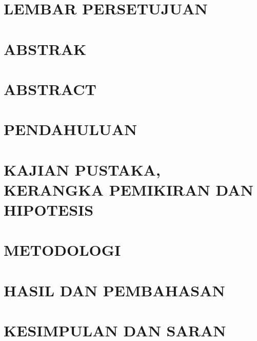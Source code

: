 \documentclass[12pt, a4paper, onecolumn, oneside, final]{report}
\begin{document}
\singlespacing



\setcounter{page}{1}
\singlespacing

\chapter*{LEMBAR PERSETUJUAN}


\chapter*{ABSTRAK}


\chapter*{ABSTRACT}


\singlespacing
\tableofcontents
\listoffigures
\listoftables
\clearpage

\doublespacing
\renewcommand{\thechapter}{\Roman{chapter}}
\renewcommand{\thesection}{\arabic{chapter}.\arabic{section}}
\renewcommand{\thefigure}{\arabic{chapter}.\arabic{figure}}
\renewcommand{\thetable}{\arabic{chapter}.\arabic{table}}
\chapter{PENDAHULUAN} 
 

\chapter{KAJIAN PUSTAKA, KERANGKA PEMIKIRAN DAN HIPOTESIS}


\chapter{METODOLOGI}


\chapter{HASIL DAN PEMBAHASAN}


\chapter{KESIMPULAN DAN SARAN}

\singlespacing
\renewcommand{\bibname}{Daftar Pustaka} %

\end{document}
